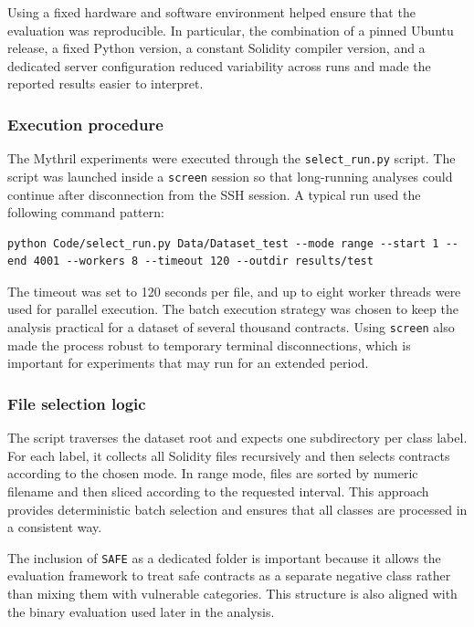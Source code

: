\documentclass[a4paper,11pt]{article}\usepackage{graphicx} %
\begin{document}
Using a fixed hardware and software environment helped ensure that the evaluation was reproducible. In particular, the combination of a pinned Ubuntu release, a fixed Python version, a constant Solidity compiler version, and a dedicated server configuration reduced variability across runs and made the reported results easier to interpret.

\subsubsection{Execution procedure}

The Mythril experiments were executed through the \texttt{select\_run.py} script. The script was launched inside a \texttt{screen} session so that long-running analyses could continue after disconnection from the SSH session. A typical run used the following command pattern:
\begin{verbatim}
python Code/select_run.py Data/Dataset_test --mode range --start 1 --end 4001 --workers 8 --timeout 120 --outdir results/test
\end{verbatim}

The timeout was set to 120 seconds per file, and up to eight worker threads were used for parallel execution. The batch execution strategy was chosen to keep the analysis practical for a dataset of several thousand contracts. Using \texttt{screen} also made the process robust to temporary terminal disconnections, which is important for experiments that may run for an extended period.

\subsubsection{File selection logic}

The script traverses the dataset root and expects one subdirectory per class label. For each label, it collects all Solidity files recursively and then selects contracts according to the chosen mode. In range mode, files are sorted by numeric filename and then sliced according to the requested interval. This approach provides deterministic batch selection and ensures that all classes are processed in a consistent way.

The inclusion of \texttt{SAFE} as a dedicated folder is important because it allows the evaluation framework to treat safe contracts as a separate negative class rather than mixing them with vulnerable categories. This structure is also aligned with the binary evaluation used later in the analysis.
\end{document}
